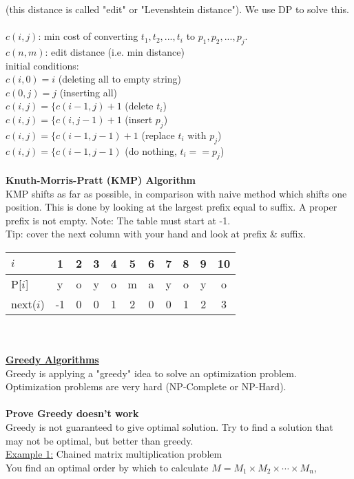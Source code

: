 \documentclass[8pt,letterpaper,twocolumn]{article}
\begin{document}
(this distance is called "edit" or "Levenshtein distance"). We use DP to solve this.\\
\\
$c(i,j)$: min cost of converting $t_1,t_2,...,t_i$ to $p_1,p_2,...,p_j$.\\
$c(n,m)$: edit distance (i.e. min distance)\\
initial conditions:\\
$c(i,0)=i$ (deleting all to empty string)\\
$c(0,j)=j$ (inserting all)\\
$c(i,j)=\{c(i-1,j)+1$ (delete $t_i$)\\
$c(i,j)=\{c(i,j-1)+1$ (insert $p_j$)\\
$c(i,j)=\{c(i-1,j-1)+1$ (replace $t_i$ with $p_j$)\\
$c(i,j)=\{c(i-1,j-1)$ (do nothing, $t_i==p_j$)\\
\\
\textbf{Knuth-Morris-Pratt (KMP) Algorithm}\\
KMP shifts as far as possible, in comparison with naive method which shifts one position.
This is done by looking at the largest prefix equal to suffix. A proper prefix is not empty.
Note: The table must start at -1.\\Tip: cover the next column with your hand and look at prefix \& suffix.\\
\begin{tabular}{ l| c| c| c| c| c| c| c| c| c| c| }
$i$ & 1 & 2 & 3 & 4 & 5 & 6 & 7 & 8 & 9 & 10\\
\hline
P[$i$] & y & o & y & o & m & a & y & o & y & o\\
\hline
next($i$) & -1 & 0 & 0 & 1 & 2 & 0 & 0 & 1 & 2 & 3\\
\end{tabular}\\
\\
\underline{\textbf{Greedy Algorithms}}\\
Greedy is applying a "greedy" idea to solve an optimization problem.
Optimization problems are very hard (NP-Complete or NP-Hard).\\
\\
\textbf{Prove Greedy doesn't work}\\
Greedy is not guaranteed to give optimal solution.
Try to find a solution that may not be optimal, but better than greedy.\\
\underline{Example 1:} Chained matrix multiplication problem\\
You find an optimal order by which to calculate $M = M_1 \times M_2 \times \cdots \times M_n$,
\end{document}
